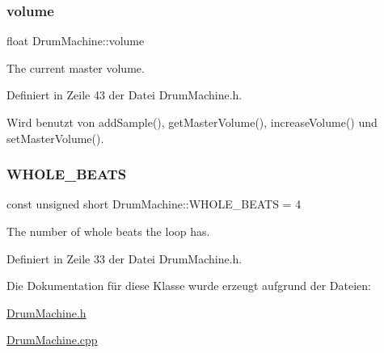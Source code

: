 \subsubsection{\texorpdfstring{volume}{volume}}
{\footnotesize\ttfamily float Drum\+Machine\+::volume\hspace{0.3cm}{\ttfamily [private]}}



The current master volume. 



Definiert in Zeile 43 der Datei Drum\+Machine.\+h.



Wird benutzt von add\+Sample(), get\+Master\+Volume(), increase\+Volume() und set\+Master\+Volume().

\mbox{\label{class_drum_machine_a54e06658e13970dc7679051e8194f546}} 
\subsubsection{\texorpdfstring{W\+H\+O\+L\+E\+\_\+\+B\+E\+A\+TS}{WHOLE\_BEATS}}
{\footnotesize\ttfamily const unsigned short Drum\+Machine\+::\+W\+H\+O\+L\+E\+\_\+\+B\+E\+A\+TS = 4\hspace{0.3cm}{\ttfamily [private]}}



The number of whole beats the loop has. 



Definiert in Zeile 33 der Datei Drum\+Machine.\+h.



Die Dokumentation für diese Klasse wurde erzeugt aufgrund der Dateien\+:\begin{DoxyCompactItemize}
\item 
\hyperlink{_drum_machine_8h}{Drum\+Machine.\+h}\item 
\hyperlink{_drum_machine_8cpp}{Drum\+Machine.\+cpp}\end{DoxyCompactItemize}
